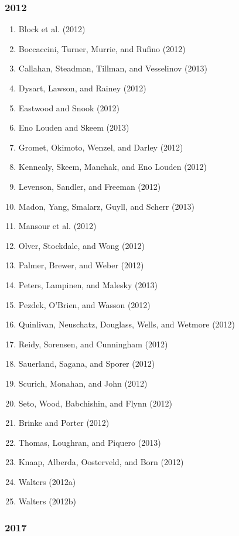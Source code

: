 \documentclass[english,man]{apa6}
\providecommand{\tightlist}{%
  \setlength{\itemsep}{0pt}\setlength{\parskip}{0pt}}
\theoremstyle{definition}
\theoremstyle{definition}
\theoremstyle{definition}
\theoremstyle{remark}
\begin{document}
\subsubsection{2012}\label{section-24}

\begin{enumerate}
\def\labelenumi{\arabic{enumi})}
\tightlist
\item
  Block et al. (2012)
\item
  Boccaccini, Turner, Murrie, and Rufino (2012)
\item
  Callahan, Steadman, Tillman, and Vesselinov (2013)
\item
  Dysart, Lawson, and Rainey (2012)
\item
  Eastwood and Snook (2012)
\item
  Eno Louden and Skeem (2013)
\item
  Gromet, Okimoto, Wenzel, and Darley (2012)
\item
  Kennealy, Skeem, Manchak, and Eno Louden (2012)
\item
  Levenson, Sandler, and Freeman (2012)
\item
  Madon, Yang, Smalarz, Guyll, and Scherr (2013)
\item
  Mansour et al. (2012)
\item
  Olver, Stockdale, and Wong (2012)
\item
  Palmer, Brewer, and Weber (2012)
\item
  Peters, Lampinen, and Malesky (2013)
\item
  Pezdek, O'Brien, and Wasson (2012)
\item
  Quinlivan, Neuschatz, Douglass, Wells, and Wetmore (2012)
\item
  Reidy, Sorensen, and Cunningham (2012)
\item
  Sauerland, Sagana, and Sporer (2012)
\item
  Scurich, Monahan, and John (2012)
\item
  Seto, Wood, Babchishin, and Flynn (2012)
\item
  Brinke and Porter (2012)
\item
  Thomas, Loughran, and Piquero (2013)
\item
  Knaap, Alberda, Oosterveld, and Born (2012)
\item
  Walters (2012a)
\item
  Walters (2012b)
\end{enumerate}

\subsubsection{2017}\label{section-25}
\end{document}

